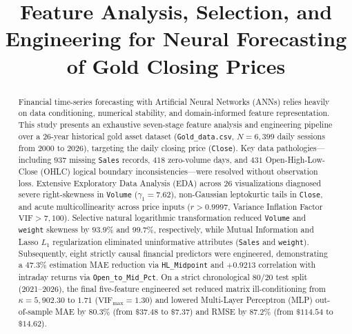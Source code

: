 \documentclass[conference]{IEEEtran}
\begin{document}
\title{Feature Analysis, Selection, and Engineering for Neural Forecasting of Gold Closing Prices}

\author{
}

\maketitle

\begin{abstract}
Financial time-series forecasting with Artificial Neural Networks (ANNs) relies heavily on data conditioning, numerical stability, and domain-informed feature representation. This study presents an exhaustive seven-stage feature analysis and engineering pipeline over a 26-year historical gold asset dataset (\texttt{Gold\_data.csv}, $N = 6{,}399$ daily sessions from 2000 to 2026), targeting the daily closing price (\texttt{Close}). Key data pathologies---including $937$ missing \texttt{Sales} records, $418$ zero-volume days, and $431$ Open-High-Low-Close (OHLC) logical boundary inconsistencies---were resolved without observation loss. Extensive Exploratory Data Analysis (EDA) across 26 visualizations diagnosed severe right-skewness in \texttt{Volume} ($\gamma_1 = 7.62$), non-Gaussian leptokurtic tails in \texttt{Close}, and acute multicollinearity across price inputs ($r > 0.9997$, Variance Inflation Factor $\text{VIF} > 7{,}100$). Selective natural logarithmic transformation reduced \texttt{Volume} and \texttt{weight} skewness by $93.9\%$ and $99.7\%$, respectively, while Mutual Information and Lasso $L_1$ regularization eliminated uninformative attributes (\texttt{Sales} and \texttt{weight}). Subsequently, eight strictly causal financial predictors were engineered, demonstrating a $47.3\%$ estimation MAE reduction via \texttt{HL\_Midpoint} and $+0.9213$ correlation with intraday returns via \texttt{Open\_to\_Mid\_Pct}. On a strict chronological 80/20 test split (2021--2026), the final five-feature engineered set reduced matrix ill-conditioning from $\kappa = 5{,}902.30$ to $1.71$ ($\text{VIF}_{\max} = 1.30$) and lowered Multi-Layer Perceptron (MLP) out-of-sample MAE by $80.3\%$ (from $\$37.48$ to $\$7.37$) and RMSE by $87.2\%$ (from $\$114.54$ to $\$14.62$).
\end{abstract}
\end{document}
